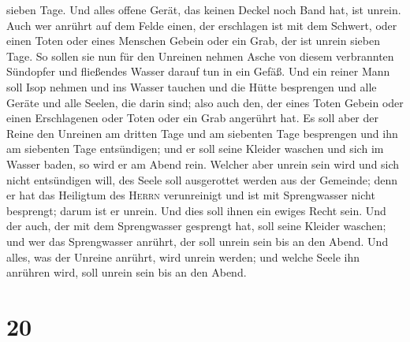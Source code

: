 sieben Tage.  Und alles offene Gerät, das keinen Deckel
noch Band hat, ist unrein.  Auch wer anrührt auf dem
Felde einen, der erschlagen ist mit dem Schwert, oder einen Toten oder
eines Menschen Gebein oder ein Grab, der ist unrein sieben Tage.
 So sollen sie nun für den Unreinen nehmen Asche von
diesem verbrannten Sündopfer und fließendes Wasser darauf tun in ein
Gefäß.  Und ein reiner Mann soll Isop nehmen und ins
Wasser tauchen und die Hütte besprengen und alle Geräte und alle Seelen,
die darin sind; also auch den, der eines Toten Gebein oder einen
Erschlagenen oder Toten oder ein Grab angerührt hat.  Es
soll aber der Reine den Unreinen am dritten Tage und am siebenten Tage
besprengen und ihn am siebenten Tage entsündigen; und er soll seine
Kleider waschen und sich im Wasser baden, so wird er am Abend rein.
 Welcher aber unrein sein wird und sich nicht entsündigen
will, des Seele soll ausgerottet werden aus der Gemeinde; denn er hat
das Heiligtum des \textsc{Herrn} verunreinigt und ist mit Sprengwasser
nicht besprengt; darum ist er unrein.  Und dies soll
ihnen ein ewiges Recht sein. Und der auch, der mit dem Sprengwasser
gesprengt hat, soll seine Kleider waschen; und wer das Sprengwasser
anrührt, der soll unrein sein bis an den Abend.  Und
alles, was der Unreine anrührt, wird unrein werden; und welche Seele ihn
anrühren wird, soll unrein sein bis an den Abend.

\hypertarget{section-19}{%
\section{20}\label{section-19}}


